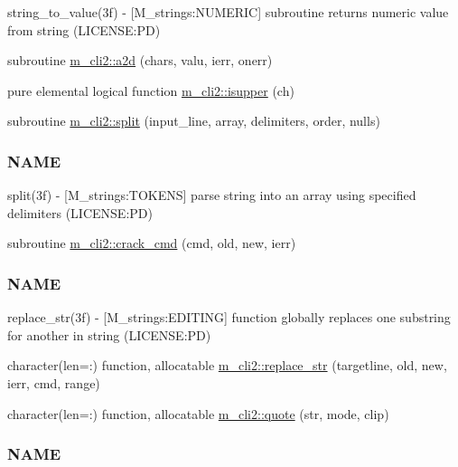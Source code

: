 \begin{DoxyCompactItemize}
\begin{DoxyCompactList}
string\+\_\+to\+\_\+value(3f) -\/ \mbox{[}M\+\_\+strings\+:N\+U\+M\+E\+R\+IC\mbox{]} subroutine returns numeric value from string (L\+I\+C\+E\+N\+SE\+:PD) \end{DoxyCompactList}\item 
subroutine \mbox{\hyperlink{namespacem__cli2_ad9e1de0ea9d2b4ed758b2a76bf143bd2}{m\+\_\+cli2\+::a2d}} (chars, valu, ierr, onerr)
\item 
pure elemental logical function \mbox{\hyperlink{namespacem__cli2_ad33ebc8ed3953d8cd91bd8c90a49b59d}{m\+\_\+cli2\+::isupper}} (ch)
\item 
subroutine \mbox{\hyperlink{namespacem__cli2_a6578e29ee4dc56651528e7e0acd29665}{m\+\_\+cli2\+::split}} (input\+\_\+line, array, delimiters, order, nulls)
\begin{DoxyCompactList}\small\item\em \subsubsection*{N\+A\+ME}

split(3f) -\/ \mbox{[}M\+\_\+strings\+:T\+O\+K\+E\+NS\mbox{]} parse string into an array using specified delimiters (L\+I\+C\+E\+N\+SE\+:PD) \end{DoxyCompactList}\item 
subroutine \mbox{\hyperlink{namespacem__cli2_a710b26995119aee101959555b1bac8e2}{m\+\_\+cli2\+::crack\+\_\+cmd}} (cmd, old, new, ierr)
\begin{DoxyCompactList}\small\item\em \subsubsection*{N\+A\+ME}

replace\+\_\+str(3f) -\/ \mbox{[}M\+\_\+strings\+:E\+D\+I\+T\+I\+NG\mbox{]} function globally replaces one substring for another in string (L\+I\+C\+E\+N\+SE\+:PD) \end{DoxyCompactList}\item 
character(len=\+:) function, allocatable \mbox{\hyperlink{namespacem__cli2_a8f65cf1b227d837d89437368c660666f}{m\+\_\+cli2\+::replace\+\_\+str}} (targetline, old, new, ierr, cmd, range)
\item 
character(len=\+:) function, allocatable \mbox{\hyperlink{namespacem__cli2_a63f81a2c027eb5f3e0a77167ac29fc73}{m\+\_\+cli2\+::quote}} (str, mode, clip)
\begin{DoxyCompactList}\small\item\em \subsubsection*{N\+A\+ME}


\end{DoxyCompactList}
\end{DoxyCompactItemize}
